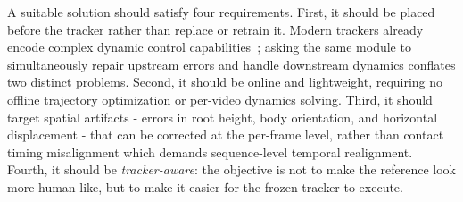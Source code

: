 \documentclass{article}
\begin{document}


	
	



	A suitable solution should satisfy four requirements. First, it should be placed before the tracker rather than replace or retrain it. Modern trackers already encode complex dynamic control capabilities~\cite{}; asking the same module to simultaneously repair upstream errors and handle downstream dynamics conflates two distinct problems. Second, it should be online and lightweight, requiring no offline trajectory optimization or per-video dynamics solving. Third, it should target spatial artifacts - errors in root height, body orientation, and horizontal displacement - that can be corrected at the per-frame level, rather than contact timing misalignment which demands sequence-level temporal realignment. Fourth, it should be \textit{tracker-aware}: the objective is not to make the reference look more human-like, but to make it easier for the frozen tracker to execute.
	






\end{document}
